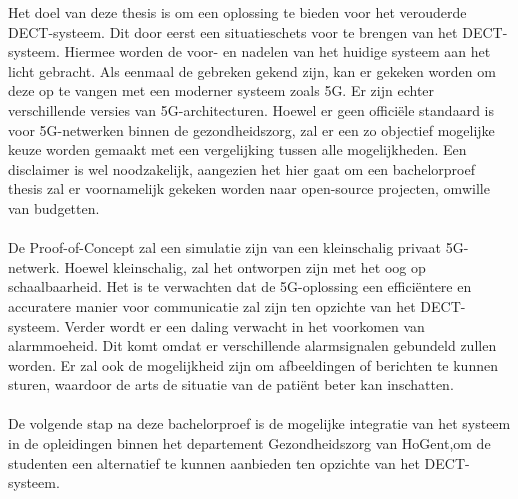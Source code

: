 Het doel van deze thesis is om een oplossing te bieden voor het verouderde DECT-systeem. Dit door eerst een situatieschets voor te brengen van het DECT-systeem. Hiermee worden de voor- en nadelen van het huidige systeem aan het licht gebracht. Als eenmaal de gebreken gekend zijn, kan er gekeken worden om deze op te vangen met een moderner systeem zoals 5G. Er zijn echter verschillende versies van 5G-architecturen. Hoewel er geen officiële standaard is voor 5G-netwerken binnen de gezondheidszorg, zal er een zo objectief mogelijke keuze worden gemaakt met een vergelijking tussen alle mogelijkheden. Een disclaimer is wel noodzakelijk, aangezien het hier gaat om een bachelorproef thesis zal er voornamelijk gekeken worden naar open-source projecten, omwille van budgetten. \\\\
De Proof-of-Concept zal een simulatie zijn van een kleinschalig privaat 5G-netwerk. Hoewel kleinschalig, zal het ontworpen zijn met het oog op schaalbaarheid. Het is te verwachten dat de 5G-oplossing een efficiëntere en accuratere manier voor communicatie zal zijn ten opzichte van het DECT-systeem. Verder wordt er een daling verwacht in het voorkomen van alarmmoeheid. Dit komt omdat er verschillende alarmsignalen gebundeld zullen worden. Er zal ook de mogelijkheid zijn om afbeeldingen of berichten te kunnen sturen, waardoor de arts de situatie van de patiënt beter kan inschatten.\\\\
De volgende stap na deze bachelorproef is de mogelijke integratie van het systeem in de opleidingen binnen het departement Gezondheidszorg van HoGent,om de studenten een alternatief te kunnen aanbieden ten opzichte van het DECT-systeem.
